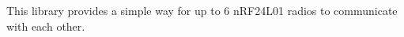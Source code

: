This library provides a simple way for up to 6 n\+R\+F24\+L01 radios to communicate with each other. 